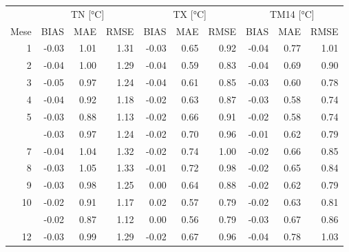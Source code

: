 
\begin{tabular}[t]{rrrrrrrrrr}
\toprule
\multicolumn{1}{c}{ } & \multicolumn{3}{c}{TN [\unit{\degreeCelsius}]} & \multicolumn{3}{c}{TX [\unit{\degreeCelsius}]} & \multicolumn{3}{c}{TM14\tnote{*} [\unit{\degreeCelsius}]} \\
\cmidrule(l{3pt}r{3pt}){2-4} \cmidrule(l{3pt}r{3pt}){5-7} \cmidrule(l{3pt}r{3pt}){8-10}
Mese & BIAS & MAE & RMSE & BIAS & MAE & RMSE & BIAS & MAE & RMSE\\
\midrule
1 & -0.03 & 1.01 & 1.31 & -0.03 & 0.65 & 0.92 & -0.04 & 0.77 & 1.01\\
2 & -0.04 & 1.00 & 1.29 & -0.04 & 0.59 & 0.83 & -0.04 & 0.69 & 0.90\\
3 & -0.05 & 0.97 & 1.24 & -0.04 & 0.61 & 0.85 & -0.03 & 0.60 & 0.78\\
4 & -0.04 & 0.92 & 1.18 & -0.02 & 0.63 & 0.87 & -0.03 & 0.58 & 0.74\\
5 & -0.03 & 0.88 & 1.13 & -0.02 & 0.66 & 0.91 & -0.02 & 0.58 & 0.74\\
\addlinespace
6 & -0.03 & 0.97 & 1.24 & -0.02 & 0.70 & 0.96 & -0.01 & 0.62 & 0.79\\
7 & -0.04 & 1.04 & 1.32 & -0.02 & 0.74 & 1.00 & -0.02 & 0.66 & 0.85\\
8 & -0.03 & 1.05 & 1.33 & -0.01 & 0.72 & 0.98 & -0.02 & 0.65 & 0.84\\
9 & -0.03 & 0.98 & 1.25 & 0.00 & 0.64 & 0.88 & -0.02 & 0.62 & 0.79\\
10 & -0.02 & 0.91 & 1.17 & 0.02 & 0.57 & 0.79 & -0.02 & 0.63 & 0.81\\
\addlinespace
11 & -0.02 & 0.87 & 1.12 & 0.00 & 0.56 & 0.79 & -0.03 & 0.67 & 0.86\\
12 & -0.03 & 0.99 & 1.29 & -0.02 & 0.67 & 0.96 & -0.04 & 0.78 & 1.03\\
\bottomrule
\end{tabular}